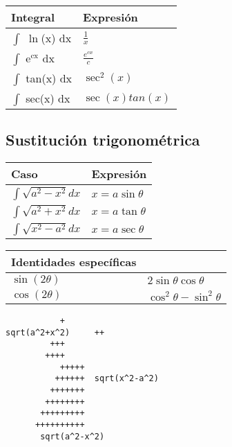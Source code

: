 \documentclass[11pt]{article}
\begin{document}
\begin{center}
\begin{tabular}{ll}
Integral & Expresión\\
\hline
$\int$ $\ln$(x) dx & $\frac{1}{x}$\\
$\int$ e$^{\text{cx}}$ dx & $\frac{e^{cx}}{c}$\\
$\int$ tan(x) dx & $\sec^2(x)$\\
$\int$ sec(x) dx & $\sec(x)tan(x)$\\
\end{tabular}
\end{center}


\subsection{Sustitución trigonométrica}
\label{sec-2-6}


\begin{center}
\begin{tabular}{ll}
Caso & Expresión\\
\hline
$\int \sqrt{a^2 -x^2} dx$ & $x = a \sin \theta$\\
$\int \sqrt{a^2 + x^2} dx$ & $x = a \tan \theta$\\
$\int \sqrt{x^2 -a^2} dx$ & $x = a \sec \theta$\\
\end{tabular}
\end{center}

\begin{center}
\begin{tabular}{ll}
Identidades específicas & \\
\hline
$\sin(2\theta)$ & $2 \sin\theta \cos\theta$\\
$\cos(2\theta)$ & $\cos^2\theta - \sin^2\theta$\\
\end{tabular}
\end{center}



\begin{verbatim}
		   +
sqrt(a^2+x^2)     ++
		 +++
		++++
	       +++++
	      ++++++  sqrt(x^2-a^2)
	     +++++++
	    ++++++++
	   +++++++++
	  ++++++++++
	   sqrt(a^2-x^2)
\end{verbatim}
\end{document}
